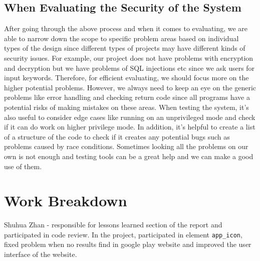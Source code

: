 \documentclass[12pt, a4paper]{article}
\newcommand{\code}[1]{\texttt{#1}}
\begin{document}
\subsection{When Evaluating the Security of the System}
After going through the above process and when it comes to evaluating, we are able to narrow down the scope to specific problem areas based on individual types of the design since different types of projects may have different kinds of security issues. For example, our project does not have problems with encryption and decryption but we have problems of SQL injections etc since we ask users for input keywords. Therefore, for efficient evaluating, we should focus more on the higher potential problems. However, we always need to keep an eye on the generic problems like error handling and checking return code since all programs have a potential risks of making mistakes on these areas. When testing the system, it's also useful to consider edge cases like running on an unprivileged mode and check if it can do work on higher privilege mode. In addition, it's helpful to create a list of a structure of the code to check if it creates any potential bugs such as problems caused by race conditions. 
Sometimes looking all the problems on our own is not enough and testing tools can be a great help and we can make a good use of them.
\section{Work Breakdown}
Shuhua Zhan - responsible for lessons learned section of the report and participated in code review. In the project, participated in element \code{app\_icon}, fixed problem when no results find in google play website and improved the user interface of the website.


\newcommand{\citeWeb}[3]{#1, \url{#2}, Retrieved #3.}
\end{document}
